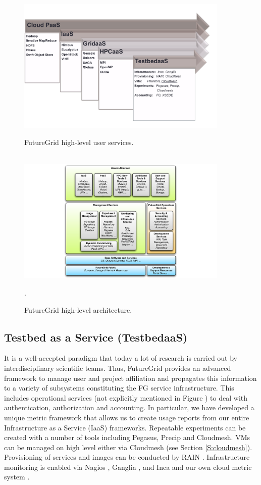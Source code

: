 \documentclass[graybox]{svmult}
\begin{document}
\begin{figure}[p]
 \centering
   \includegraphics[width=0.9\textwidth]{images/user-services.pdf}
 \caption{FutureGrid high-level user services.}\label{F:services}
 ~\\
 \centering
 \includegraphics[width=0.9\textwidth]{images/architecture.pdf}
 \caption{FutureGrid high-level architecture.}\label{F:arch}.
\end{figure}

\subsection{Testbed as a Service (TestbedaaS)}

It is a well-accepted paradigm that today a lot of research is carried out by interdisciplinary scientific teams. Thus, FutureGrid provides an advanced framework to manage user and project affiliation and propagates this information to a variety of subsystems constituting the FG service infrastructure. This includes operational services (not explicitly mentioned in Figure \label{F:services}) to deal with authentication, authorization and accounting. In particular, we have developed a unique metric framework that allows us to create usage reports from our entire Infrastructure as a Service (IaaS) frameworks. Repeatable experiments can be created with a number of tools including Pegasus, Precip and Cloudmesh. VMs can be managed on high level either via Cloudmesh (see Section \ref{S:cloudmesh}). Provisioning of services and images can be conducted by RAIN \cite{imagemanagement,fg-1295}. Infrastructure monitoring is enabled via Nagios \cite{nagios}, Ganglia \cite{ganglia}, and Inca \cite{inca} and our own cloud metric system \cite{las08federated-cloud}.
\end{document}
